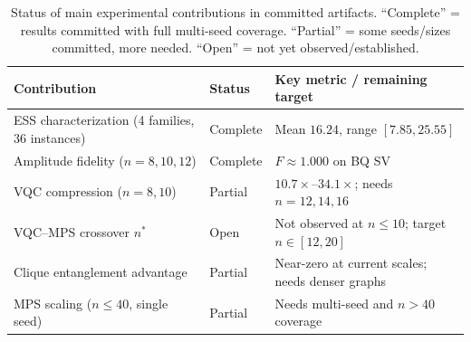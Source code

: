     
    
    \begin{table}[t]
    \centering
    \caption{Status of main experimental contributions in committed
    artifacts. ``Complete'' = results committed with full multi-seed
    coverage. ``Partial'' = some seeds/sizes committed, more needed.
    ``Open'' = not yet observed/established.}
    \label{tab:status}
    \begin{tabular}{p{3.2cm}p{1.4cm}p{3.0cm}}
    \toprule
    \textbf{Contribution} & \textbf{Status} & \textbf{Key metric /
    remaining target} \\
    \midrule
    ESS characterization (4 families, 36 instances) &
    Complete &
    Mean $16.24$, range $[7.85, 25.55]$ \\
    \addlinespace
    Amplitude fidelity ($n=8,10,12$) &
    Complete &
    $F \approx 1.000$ on BQ SV \\
    \addlinespace
    VQC compression ($n=8,10$) &
    Partial &
    $10.7\times$--$34.1\times$; needs $n=12,14,16$ \\
    \addlinespace
    VQC--MPS crossover $n^*$ &
    Open &
    Not observed at $n \leq 10$; target $n \in [12, 20]$ \\
    \addlinespace
    Clique entanglement advantage &
    Partial &
    Near-zero at current scales; needs denser graphs \\
    \addlinespace
    MPS scaling ($n \leq 40$, single seed) &
    Partial &
    Needs multi-seed and $n > 40$ coverage \\
    \bottomrule
    \end{tabular}
    \end{table}
    
    
    
